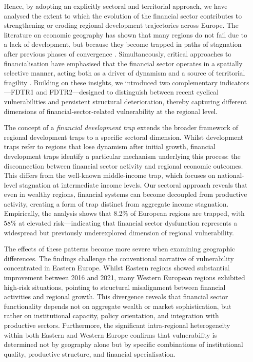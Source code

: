\documentclass[a4paper,11pt,oneside]{article}
\begin{document}
Hence, by adopting an explicitly sectoral and territorial approach, we have analysed the extent to which the evolution of the financial sector contributes to strengthening or eroding regional development trajectories across Europe. The literature on economic geography has shown that many regions do not fail due to a lack of development, but because they become trapped in paths of stagnation after previous phases of convergence \citep{diemer2022regional}. Simultaneously, critical approaches to financialisation have emphasised that the financial sector operates in a spatially selective manner, acting both as a driver of dynamism and a source of territorial fragility \citep{sokol2017financialisation,martin2011local}. Building on these insights, we introduced two complementary indicators---FDTR1 and FDTR2---designed to distinguish between recent cyclical vulnerabilities and persistent structural deterioration, thereby capturing different dimensions of financial-sector-related vulnerability at the regional level.

The concept of a \textit{financial development trap} extends the broader framework of regional development traps to a specific sectoral dimension. Whilst development traps refer to regions that lose dynamism after initial growth, financial development traps identify a particular mechanism underlying this process: the disconnection between financial sector activity and regional economic outcomes. This differs from the well-known middle-income trap, which focuses on national-level stagnation at intermediate income levels. Our sectoral approach reveals that even in wealthy regions, financial systems can become decoupled from productive activity, creating a form of trap distinct from aggregate income stagnation. Empirically, the analysis shows that 8.2\% of European regions are trapped, with 58\% at elevated risk---indicating that financial sector dysfunction represents a widespread but previously underexplored dimension of regional vulnerability.

The effects of these patterns become more severe when examining geographic differences. The findings challenge the conventional narrative of vulnerability concentrated in Eastern Europe. Whilst Eastern regions showed substantial improvement between 2016 and 2021, many Western European regions exhibited high-risk situations, pointing to structural misalignment between financial activities and regional growth. This divergence reveals that financial sector functionality depends not on aggregate wealth or market sophistication, but rather on institutional capacity, policy orientation, and integration with productive sectors. Furthermore, the significant intra-regional heterogeneity within both Eastern and Western Europe confirms that vulnerability is determined not by geography alone but by specific combinations of institutional quality, productive structure, and financial specialisation.
\end{document}
